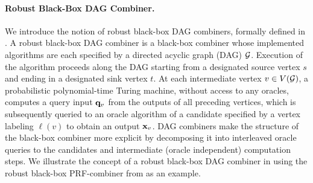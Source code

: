 \paragraph{Robust Black-Box DAG Combiner.}
We introduce the notion of robust black-box DAG combiners, formally defined in 
. A robust black-box DAG combiner is a black-box combiner whose implemented 
algorithms are each specified by a directed acyclic graph (DAG) $\mathcal{G}$. Execution of the algorithm proceeds along the DAG starting 
from a designated source vertex $s$ and ending in a designated sink vertex $t$.
At each intermediate vertex $v \in V(\mathcal{G})$, a probabilistic polynomial-time Turing machine, without access to any oracles, computes a query input 
$\mathbf{q}_v$ from the outputs of all preceding vertices, which is subsequently queried to an oracle algorithm of a candidate specified 
by a vertex labeling $\ell(v)$ to obtain an output $\mathbf{x}_v$.
DAG combiners make the structure of the black-box combiner more explicit 
by decomposing it into interleaved oracle queries to the candidates and intermediate (oracle independent)
computation steps.
We illustrate the concept of a robust black-box DAG combiner in  using the robust black-box PRF-combiner from  as an example.

